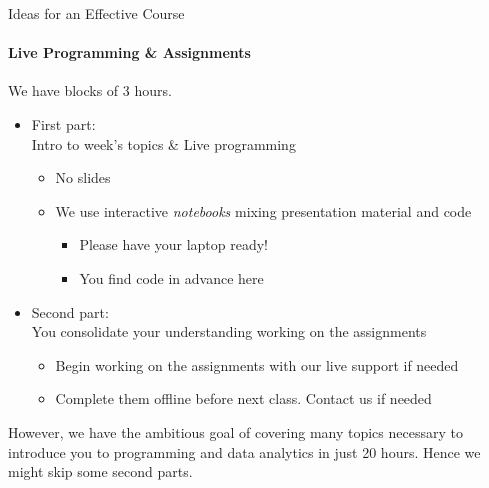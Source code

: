 \documentclass{beamer}%
\begin{document}
\begin{frame}{Ideas for an Effective Course} 
\framesubtitle{Live Programming \& Assignments}
We have blocks of 3 hours.
\begin{itemize}
\item First part: %
\\ Intro to week's topics \& Live programming
    \begin{itemize}
    \item No slides
    \item We use interactive \emph{notebooks} mixing presentation material and code %
      \begin{itemize}
      \item Please have your laptop ready! \myurl{\homepagesetup}
	  \item You find code in advance here %
      \end{itemize}
    \end{itemize}


\item Second part: %
\\ You consolidate your understanding working on the assignments
\begin{itemize}
\item Begin working on the assignments with our live support if needed
\item Complete them offline before next class. Contact us if needed
\end{itemize}
\end{itemize}
\pause
{\color{red}
However, we have the ambitious goal of covering many topics necessary to introduce you to programming and data analytics in just 20 hours. Hence we might skip some second parts.
}
\end{frame}





\end{document}
